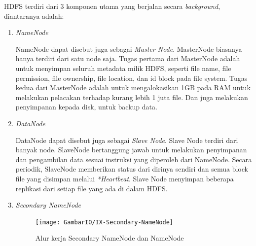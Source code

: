 	HDFS terdiri dari 3 komponen utama yang berjalan secara \textit{background}, diantaranya adalah: 
		\begin{enumerate}
			\item \textit{NameNode}
			
			NameNode dapat disebut juga sebagai \textit{Master Node}. MasterNode biasanya hanya terdiri dari satu node saja. Tugas pertama dari MasterNode adalah untuk menyimpan seluruh metadata milik HDFS, seperti file name, file permission, file ownership, file location, dan id block pada file system. Tugas kedua dari MasterNode adalah untuk mengalokasikan 1GB pada RAM untuk melakukan pelacakan terhadap kurang lebih 1 juta file. Dan juga melakukan penyimpanan kepada disk, untuk backup data.
			\item \textit{DataNode}
			
			DataNode dapat disebut juga sebagai \textit{Slave Node}. Slave Node terdiri dari banyak node. SlaveNode bertanggung jawab untuk melakukan penyimpanan dan pengambilan data sesuai instruksi yang diperoleh dari NameNode. Secara periodik, SlaveNode memberikan status dari dirinya sendiri dan semua block file yang disimpan melalui \textit{*Heartbeat}. Slave Node menyimpan beberapa replikasi dari setiap file yang ada di dalam HDFS.
			\item \textit{Secondary NameNode}

			\begin{figure}[h]
			\centering
			\texttt{[image: GambarIO/IX-Secondary-NameNode]}
			\caption[Alur kerja Secondary NameNode dan NameNode]{Alur kerja Secondary NameNode dan NameNode}
			\label{fig:IX-Secondary-NameNode}
			\end{figure}



\end{enumerate}
